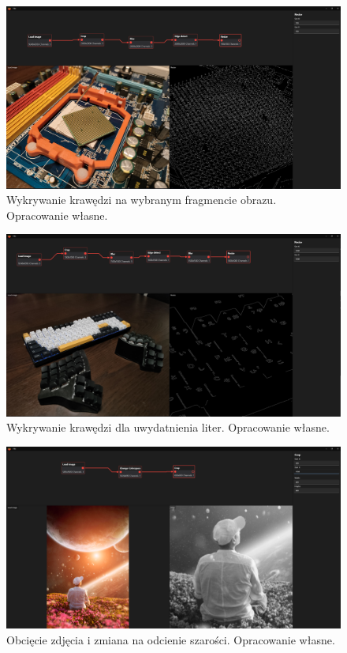 \begin{figure}[H]
    \centering
    \includegraphics[width=1\linewidth]{images/Picture27.png}
    \caption{Wykrywanie krawędzi na wybranym fragmencie obrazu. Opracowanie własne.}
    \label{fig:socket}
\end{figure} 

\begin{figure}[H]
    \centering
    \includegraphics[width=1\linewidth]{images/Picture28.png}
    \caption{Wykrywanie krawędzi dla uwydatnienia liter. Opracowanie własne.}
    \label{fig:keyboard}
\end{figure} 

\begin{figure}[H]
    \centering
    \includegraphics[width=1\linewidth]{images/Picture29.png}
    \caption{Obcięcie zdjęcia i zmiana na odcienie szarości. Opracowanie własne.}
    \label{fig:person}
\end{figure} 

